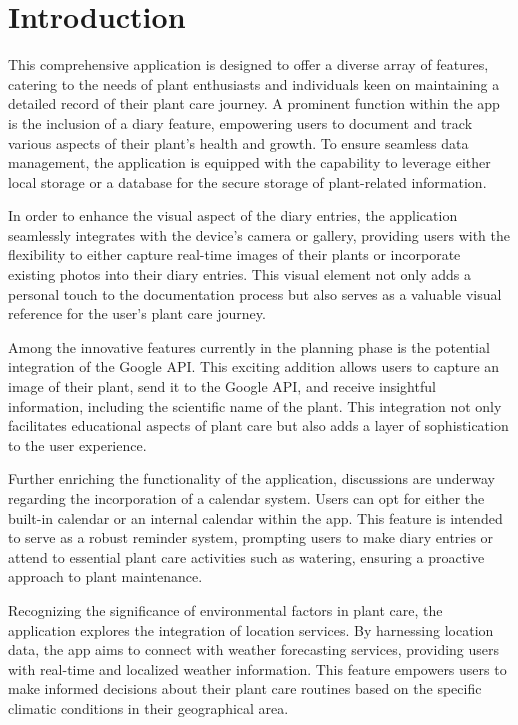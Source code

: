 \documentclass{sigchi}
\def\plainkeywords{Authors' choice; of terms; separated; by
  semicolons; include commas, within terms only; this section is required.}
\begin{document}



\section{Introduction}

This comprehensive application is designed to offer a diverse array of features, catering to the needs of plant enthusiasts and individuals keen on maintaining a detailed record of their plant care journey. A prominent function within the app is the inclusion of a diary feature, empowering users to document and track various aspects of their plant's health and growth. To ensure seamless data management, the application is equipped with the capability to leverage either local storage or a database for the secure storage of plant-related information.

In order to enhance the visual aspect of the diary entries, the application seamlessly integrates with the device's camera or gallery, providing users with the flexibility to either capture real-time images of their plants or incorporate existing photos into their diary entries. This visual element not only adds a personal touch to the documentation process but also serves as a valuable visual reference for the user's plant care journey.

Among the innovative features currently in the planning phase is the potential integration of the Google API. This exciting addition allows users to capture an image of their plant, send it to the Google API, and receive insightful information, including the scientific name of the plant. This integration not only facilitates educational aspects of plant care but also adds a layer of sophistication to the user experience.

Further enriching the functionality of the application, discussions are underway regarding the incorporation of a calendar system. Users can opt for either the built-in calendar or an internal calendar within the app. This feature is intended to serve as a robust reminder system, prompting users to make diary entries or attend to essential plant care activities such as watering, ensuring a proactive approach to plant maintenance.

Recognizing the significance of environmental factors in plant care, the application explores the integration of location services. By harnessing location data, the app aims to connect with weather forecasting services, providing users with real-time and localized weather information. This feature empowers users to make informed decisions about their plant care routines based on the specific climatic conditions in their geographical area.
\end{document}
